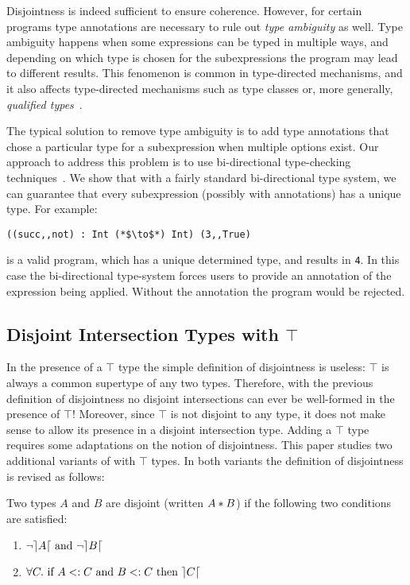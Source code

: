 Disjointness is indeed sufficient to ensure coherence. However, for
certain programs type annotations are necessary to rule out \emph{type
  ambiguity} as well. Type ambiguity happens when some expressions can 
be typed in multiple ways, and depending on which type is chosen 
for the subexpressions the program may lead to different results. 
This fenomenon is common in type-directed mechanisms, and it also 
affects type-directed mechanisms such as type classes or, more
generally, \emph{qualified types}~\cite{Mark93coherence}.

The typical solution to remove type ambiguity is to add type
annotations that chose a particular type for a subexpression when
multiple options exist. Our approach to address this problem is to 
use bi-directional type-checking techniques~\cite{Pierce00local}. We show that 
with a fairly standard bi-directional type system, we can guarantee 
that every subexpression (possibly with annotations) has a unique
type. For example:

\begin{lstlisting}
((succ,,not) : Int (*$\to$*) Int) (3,,True)
\end{lstlisting}

\noindent is a valid program, which has a unique determined type, and results in
\lstinline$4$. In this case the bi-directional type-system 
forces users to provide an annotation of the expression being applied.
Without the annotation the program would be rejected.

\subsection{Disjoint Intersection Types with $\top$} 
In the presence of a $\top$ type the simple definition of disjointness
is useless: $\top$ is always a common supertype of any two types.
Therefore, with the previous definition of disjointness no disjoint
intersections can ever be well-formed in the presence of $\top$!
Moreover, since $\top$ is not disjoint to any type, it does not make
sense to allow its presence in a disjoint intersection type.  Adding a
$\top$ type requires some adaptations on the notion of disjointness.
This paper studies two additional variants of \name with $\top$ types.
In both variants the definition of disjointness is revised as follows:

\begin{definition}
  Two types $A$ and $B$ are disjoint
  (written $A * B$) if the following two conditions are satisfied:
\begin{enumerate}
  \item $\neg \rceil A \lceil~\text{and}~\neg \rceil B \lceil$
  \item $\forall C.~\text{if}~ A <: C~\text{and}~B <: C~\text{then}~\rceil C \lceil$
\end{enumerate}
\end{definition}


